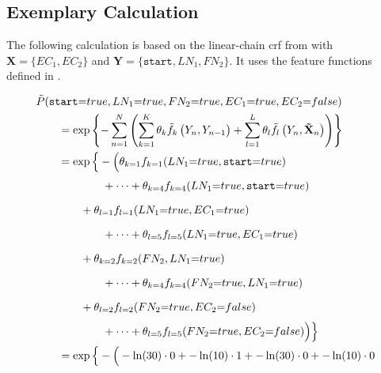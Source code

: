 \subsection{Exemplary Calculation}\label{app:subsec-lccrf-example-calculation}
The following calculation is based on the \gls{linear-chain crf} from  with $\mathbf{X}=\{EC_1,EC_2\}$ and $\mathbf{Y}=\{\texttt{start},LN_1,FN_2\}$.
It uses the \glspl{feature function} defined in .

\begin{subequations}
\begin{equation*}
\begin{split}
  &\tilde{P}(\texttt{start}{=}true,LN_1{=}true,FN_2{=}true,EC_1{=}true,EC_2{=}false)\\
  &\hspace{2em} = \exp\left\{ -\sum_{n=1}^N \left(\sum_{k=1}^K\theta_k \tilde{f}_k\left(\vphantom{\tilde{X}}Y_n,Y_{n-1}\right)+\sum_{l=1}^L\theta_l \tilde{f}_l\left(Y_n,\mathbf{\tilde{X}}_n\right)\right) \right\} \\
  &\hspace{2em} = \exp\Big\{-\Big(\theta_{k=1}f_{k=1}(LN_1{=}true,\texttt{start}{=}true)\\
  &\hspace{6em}\vphantom{\Big\{}+\cdots+\theta_{k=4}f_{k=4}(LN_1{=}true,\texttt{start}{=}true)\\
  &\hspace{4em}\vphantom{\Big\{}+\theta_{l=1}f_{l=1}(LN_1{=}true,EC_1{=}true)\\
  &\hspace{6em}\vphantom{\Big\{}+\cdots+\theta_{l=5}f_{l=5}(LN_1{=}true,EC_1{=}true)\\
  &\hspace{4em}\vphantom{\Big\{}+\theta_{k=2}f_{k=2}(FN_2,LN_1{=}true)\\
  &\hspace{6em}\vphantom{\Big\{}+\cdots+\theta_{k=4}f_{k=4}(FN_2{=}true,LN_1{=}true) \\
  &\hspace{4em}\vphantom{\Big\{}+\theta_{l=2}f_{l=2}(FN_2{=}true,EC_2{=}false)\\
  &\hspace{6em}\vphantom{\Big\{}+\cdots+\theta_{l=5}f_{l=5}(FN_2{=}true,EC_2{=}false)\Big)\Big\}\\
  &\hspace{2em} = \exp\Big\{-\Big(-\ln(30)\cdot0+-\ln(10)\cdot1+-\ln(30)\cdot0+-\ln(10)\cdot0\\

\end{split}
\end{equation*}
\end{subequations}
